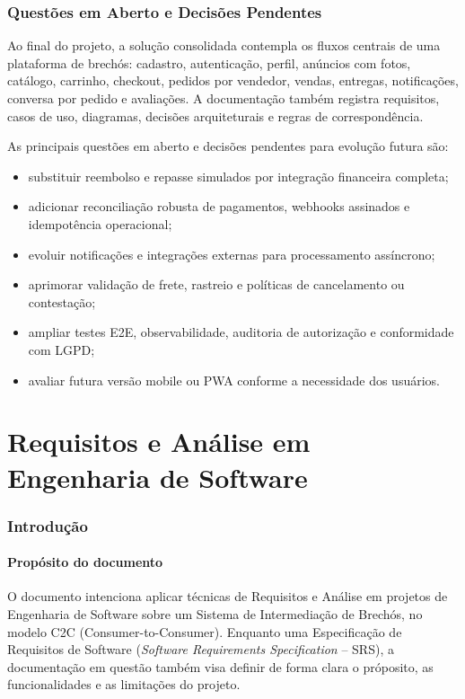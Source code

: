 ﻿\documentclass[12pt,a4paper]{article}
\begin{document}
\section{Questões em Aberto e Decisões Pendentes}
Ao final do projeto, a solução consolidada contempla os fluxos centrais de uma plataforma de brechós: cadastro, autenticação, perfil, anúncios com fotos, catálogo, carrinho, checkout, pedidos por vendedor, vendas, entregas, notificações, conversa por pedido e avaliações. A documentação também registra requisitos, casos de uso, diagramas, decisões arquiteturais e regras de correspondência.

As principais questões em aberto e decisões pendentes para evolução futura são:

\begin{itemize}
    \item substituir reembolso e repasse simulados por integração financeira completa;
    \item adicionar reconciliação robusta de pagamentos, webhooks assinados e idempotência operacional;
    \item evoluir notificações e integrações externas para processamento assíncrono;
    \item aprimorar validação de frete, rastreio e políticas de cancelamento ou contestação;
    \item ampliar testes E2E, observabilidade, auditoria de autorização e conformidade com LGPD;
    \item avaliar futura versão mobile ou PWA conforme a necessidade dos usuários.
\end{itemize}

\clearpage
\part{Requisitos e An\'alise em Engenharia de Software}
\section{Introdução}
\label{sec:Introducao}

\subsection{Propósito do documento}
\label{sec:Proposito}

O documento intenciona aplicar técnicas de Requisitos e Análise em projetos de Engenharia de Software sobre um Sistema de Intermediação de Brechós, no modelo C2C (Consumer-to-Consumer). Enquanto uma Especificação de Requisitos de Software (\textit{Software Requirements Specification} – SRS), a documentação em questão também visa definir de forma clara o próposito, as funcionalidades e as limitações do projeto.
\end{document}
